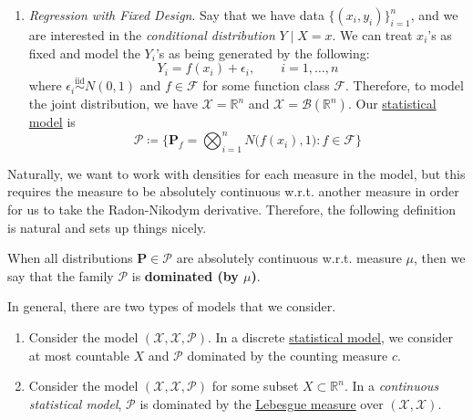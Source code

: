\begin{example}
\begin{enumerate}
      \item \textit{Regression with Fixed Design}. Say that we have data $\{(x_i, y_i)\}_{i=1}^n$, and we are interested in the \textit{conditional distribution} $Y \mid X = x$. We can treat $x_i$'s as fixed and model the $Y_i$'s as being generated by the following: 
        \begin{equation}
          Y_i = f(x_i) + \epsilon_i, \qquad i = 1, \ldots, n
        \end{equation} 
        where $\epsilon_i \overset{\text{iid}}{\sim} N(0, 1)$ and $f \in \mathcal{F}$ for some function class $\mathcal{F}$. Therefore, to model the joint distribution, we have $\mathcal{X} = \mathbb{R}^n$ and $\mathscr{X} = \mathcal{B}(\mathbb{R}^n)$. Our \hyperref[def:statistical-model]{statistical model} is 
        \begin{equation}
          \mathcal{P} \coloneqq \bigg\{ \mathbf{P}_f = \bigotimes_{i=1}^n N \big( f(x_i), 1 \big) \colon f \in \mathcal{F} \bigg\}
        \end{equation}
    \end{enumerate}
  \end{example}

  Naturally, we want to work with densities for each measure in the model, but this requires the measure to be absolutely continuous w.r.t. another measure in order for us to take the Radon-Nikodym derivative. Therefore, the following definition is natural and sets up things nicely. 

  \begin{definition}
    \label{def:dominated-families-of-measures}
    When all distributions $\mathbf{P} \in \mathcal{P}$ are absolutely continuous w.r.t. measure $\mu$, then we say that the family $\mathcal{P}$ is \textbf{dominated (by $\mu$)}. 
  \end{definition} 

  In general, there are two types of models that we consider. 
  \begin{enumerate}
    \item Consider the model $(\mathcal{X}, \mathscr{X}, \mathcal{P})$. In a discrete \hyperref[def:statistical-model]{statistical model}, we consider at most countable $X$ and $\mathcal{P}$ dominated by the counting measure $c$. 
    \item Consider the model $(\mathcal{X}, \mathscr{X}, \mathcal{P})$ for some subset $X \subset \mathbb{R}^n$. In a \textit{continuous statistical model}, $\mathcal{P}$ is dominated by the \hyperref[mt-def:lebesgue-measure]{Lebesgue measure} over $(\mathcal{X}, \mathscr{X})$. 
  \end{enumerate}

